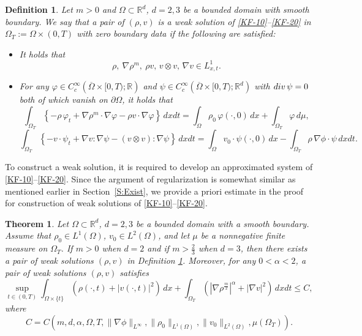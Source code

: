 \documentclass{amsart}
\newtheorem{definition}[defn]{Definition}
\newtheorem{theorem}[defn]{Theorem}
\numberwithin{equation}{section}
\newcommand{\R}{{ \mathbb{R}  }}
\newcommand{\abs}[1]{\left| #1 \right|}
\begin{document}
\begin{definition}\label{Weak-ks} Let $m>0$ and $\Omega\subset\R^d$, $d=2,3$ be a bounded domain with smooth boundary. We say that a pair of $(\rho, v)$ is a  weak solution of \eqref{KF-10}--\eqref{KF-20} in $\Omega_{T} := \Omega \times (0, T)$ with zero boundary data if the following are satisfied:
\begin{itemize}
	\item [(i)] It holds that
	\[
	\rho , \ \nabla \rho^m, \ \rho v, \, v\otimes v,\, \nabla v\in L_{x,t}^{1}.
	\]
	
	\item [(ii)] For any $\varphi \in C_{c}^{\infty} \left(\overline{\Omega} \times [0, T);\R\right)$ and $\psi \in C_{c}^{\infty} \left(\overline{\Omega} \times [0, T);\R^d\right)$ with $\rm{div}\,\psi=0$ both of which vanish on $\partial\Omega$, it holds that
	\[
	\int_{\Omega_T}\left\{-\rho\,\varphi_t+\nabla \rho^m\cdot \nabla\varphi-\rho v\cdot \nabla\varphi\right\}\,dxdt
	=
	\int_\Omega \rho_0\,\varphi(\cdot,0)\,dx
	+
	\int_{\Omega_T}\varphi\,d\mu,
	\]
	\[
	\int_{\Omega_T}\left\{-v\cdot\psi_t+\nabla v:\nabla\psi-(v\otimes v):\nabla\psi\right\}\,dxdt
	=
	\int_\Omega v_0\cdot\psi(\cdot,0)\,dx
	-
	\int_{\Omega_T}\rho\,\nabla\phi\cdot\psi\,dxdt.
	\]
\end{itemize}	
\end{definition}



To construct a weak solution, it is required to  develop an approximated system of \eqref{KF-10}--\eqref{KF-20}. Since the argument of regularization is somewhat similar as mentioned earlier in Section~\ref{S:Exist}, we provide a priori estimate in the proof for construction of weak solutions of \eqref{KF-10}--\eqref{KF-20}.

\begin{theorem}
Let  $\Omega\subset\R^d$, $d=2,3$ be a bounded domain with a smooth boundary. Assume that $\rho_0\in L^1(\Omega)$, $v_0\in L^2(\Omega)$, and let $\mu$ be a nonnegative finite measure on $\Omega_T$.
If $m>0$ when $d=2$ and if $m>\frac{2}{3}$ when $d=3$, then
there exists a pair of weak solutions $(\rho, v)$ in Definition \ref{Weak-ks}. Moreover, for any $0<\alpha<2$, a pair of weak solutions $(\rho, v)$ satisfies
\[
\sup_{t\in (0, T)} \int_{\Omega\times\{t\}} (\rho(\cdot, t) +\abs{v(\cdot, t)}^2)\,dx +\int_{\Omega_T} (\left|\nabla \rho^{\frac{m}{2}}\right|^{\alpha} +\abs{\nabla v}^2)\,dxdt\le C,
\]
where
\[
C=C\!\left(m,d,\alpha,\Omega,T,\|\nabla\phi\|_{L^\infty},
\|\rho_0\|_{L^1(\Omega)},\|v_0\|_{L^2(\Omega)},\mu(\Omega_T)\right).
\]
\end{theorem}
\end{document}
